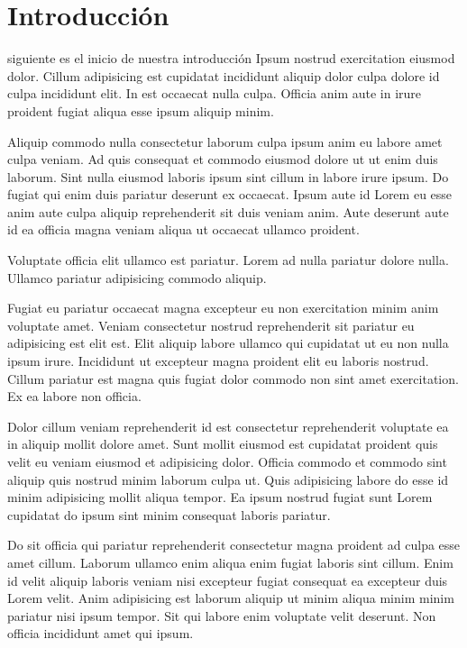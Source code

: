 
\section{Introducción}
 siguiente es el inicio de nuestra introducción
Ipsum nostrud exercitation eiusmod dolor. Cillum adipisicing est cupidatat incididunt aliquip dolor culpa dolore id culpa incididunt elit. In est occaecat nulla culpa. Officia anim aute in irure proident fugiat aliqua esse ipsum aliquip minim.

Aliquip commodo nulla consectetur laborum culpa ipsum anim eu labore amet culpa veniam. Ad quis consequat et commodo eiusmod dolore ut ut enim duis laborum. Sint nulla eiusmod laboris ipsum sint cillum in labore irure ipsum. Do fugiat qui enim duis pariatur deserunt ex occaecat. Ipsum aute id Lorem eu esse anim aute culpa aliquip reprehenderit sit duis veniam anim. Aute deserunt aute id ea officia magna veniam aliqua ut occaecat ullamco proident.

Voluptate officia elit ullamco est pariatur. Lorem ad nulla pariatur dolore nulla. Ullamco pariatur adipisicing commodo aliquip.

Fugiat eu pariatur occaecat magna excepteur eu non exercitation minim anim voluptate amet. Veniam consectetur nostrud reprehenderit sit pariatur eu adipisicing est elit est. Elit aliquip labore ullamco qui cupidatat ut eu non nulla ipsum irure. Incididunt ut excepteur magna proident elit eu laboris nostrud. Cillum pariatur est magna quis fugiat dolor commodo non sint amet exercitation. Ex ea labore non officia.

Dolor cillum veniam reprehenderit id est consectetur reprehenderit voluptate ea in aliquip mollit dolore amet. Sunt mollit eiusmod est cupidatat proident quis velit eu veniam eiusmod et adipisicing dolor. Officia commodo et commodo sint aliquip quis nostrud minim laborum culpa ut. Quis adipisicing labore do esse id minim adipisicing mollit aliqua tempor. Ea ipsum nostrud fugiat sunt Lorem cupidatat do ipsum sint minim consequat laboris pariatur.

Do sit officia qui pariatur reprehenderit consectetur magna proident ad culpa esse amet cillum. Laborum ullamco enim aliqua enim fugiat laboris sint cillum. Enim id velit aliquip laboris veniam nisi excepteur fugiat consequat ea excepteur duis Lorem velit. Anim adipisicing est laborum aliquip ut minim aliqua minim minim pariatur nisi ipsum tempor. Sit qui labore enim voluptate velit deserunt. Non officia incididunt amet qui ipsum.
